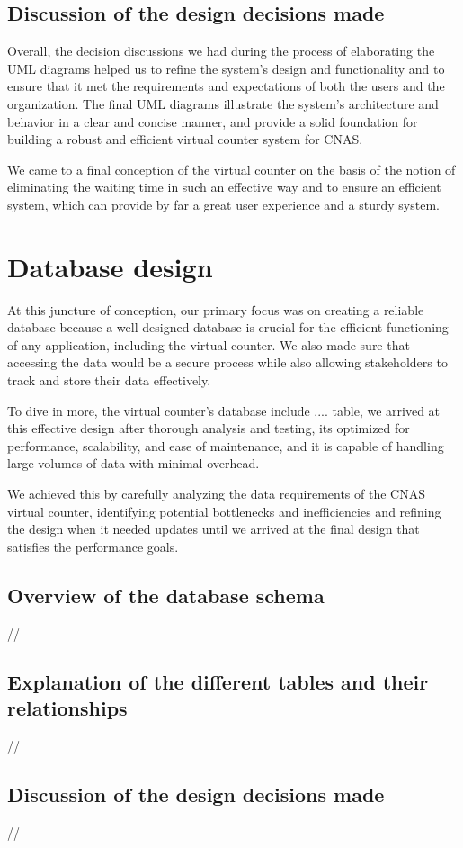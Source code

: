 \subsection{Discussion of the design decisions made}
Overall, the decision discussions we had during the process of elaborating the UML diagrams helped us to refine the system's design and functionality and to ensure that it met the requirements and expectations of both the users and the organization. The final UML diagrams illustrate the system's architecture and behavior in a clear and concise manner, and provide a solid foundation for building a robust and efficient virtual counter system for CNAS.

\medskip We came to a final conception of the virtual counter on the basis of the notion of eliminating the waiting time in such an effective way and to ensure an efficient system, which can provide by far a great user experience and a sturdy system. 

\section{Database design}
At this juncture of conception, our primary focus was on creating a reliable database because a well-designed database is crucial for the efficient functioning of any application, including the virtual counter. We also made sure that accessing the data would be a secure process while also allowing stakeholders to track and store their data effectively.

\medskip To dive in more, the virtual counter's database include .... table, we arrived at this effective design after thorough analysis and testing, its optimized for performance, scalability, and ease of maintenance, and it is capable of handling large volumes of data with minimal overhead.   

We achieved this by carefully analyzing the data requirements of the CNAS virtual counter, identifying potential bottlenecks and inefficiencies and refining the design when it needed updates until we arrived at the final design that satisfies the performance goals. 
\subsection{Overview of the database schema}
//
\subsection{Explanation of the different tables and their relationships}
//
\subsection{Discussion of the design decisions made}

//